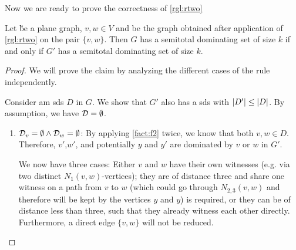 \noindent Now we are ready to prove the correctness of \cref{rgl:rtwo}
\begin{lemma}\label{lemma:correctnesstwo}
    Let \G be a plane graph, $v, w \in V$ and \GB be the graph obtained after application of \cref{rgl:rtwo} on the pair $\{v, w\}$. Then $G$ has a semitotal dominating set of size $k$ if and only if $G'$ has a semitotal dominating set of size $k$.
\end{lemma}
\begin{proof}
    We will prove the claim by analyzing the different cases of the rule independently.     

    Consider am sds $D$ in $G$.  We show that $G'$ also has a sds with $\abs{D'} \leq \abs{D}$. By assumption, we have $\mathcal{D} = \emptyset$.
        \begin{enumerate}
            \item  $ \mathcal{D}_{v} = \emptyset  \wedge \mathcal{D}_{w} = \emptyset $: By applying \cref{fact:f2} twice, we know that both  $v, w \in D$. Therefore, $v'$,$w'$, and potentially $y$ and $y'$ are dominated by $v$ or $w$ in $G'$.
            
            We now have three cases: Either $v$ and $w$ have their own witnesses (e.g. via two distinct $N_1(v,w)$-vertices); they are of distance three and share one witness on a path from $v$ to $w$ (which could go through $N_{2,3}(v,w)$ and therefore will be kept by the vertices $y$ and $y$) is required, or they can be of distance less than three, such that they already witness each other directly. 
            Furthermore, a direct edge $\{v,w\}$ will not be reduced. 


\end{enumerate}
\end{proof}
